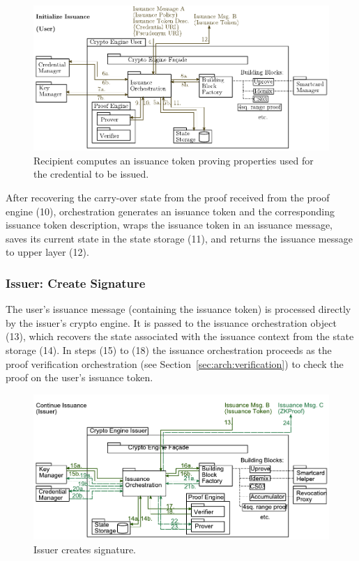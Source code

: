 \begin{figure}[htbp]
\includegraphics[width=\textwidth]{img/03.pdf}
\caption{Recipient computes an issuance token proving properties used for the credential to be issued.}
\label{fig:issuance2}
\end{figure}

After recovering the carry-over state from the proof received from the proof engine (10), orchestration 
generates an issuance token and the corresponding issuance token description, wraps the issuance token in
an issuance message, saves its current state in the state storage (11), and returns the issuance message 
to upper layer (12).




\subsubsection{Issuer: Create Signature}

The user's issuance message (containing the issuance token) is processed directly by the issuer's crypto engine.
It is passed to the issuance orchestration object (13), which recovers the state associated with the 
issuance context from the state storage (14). 
In steps (15) to (18) the issuance orchestration proceeds as the proof verification orchestration (see Section~\ref{sec:arch:verification})
to check the proof on the user's issuance token.

\begin{figure}[htbp]
\includegraphics[width=\textwidth]{img/14a.pdf}
\caption{Issuer creates signature.}
\label{fig:issuance3}
\end{figure}


